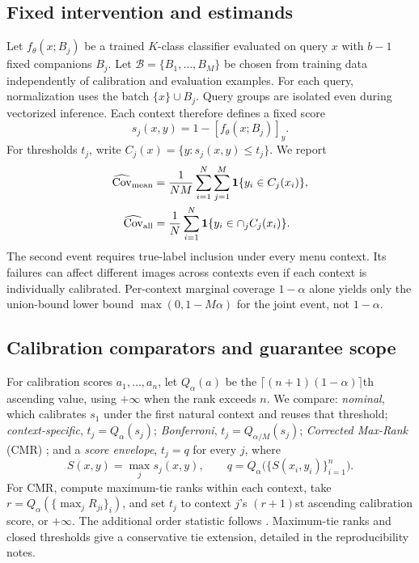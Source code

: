 \documentclass{article}
\begin{document}
\subsection{Fixed intervention and estimands}
Let $f_\theta(x;B_j)$ be a trained $K$-class classifier evaluated on query $x$ with $b-1$ fixed companions $B_j$. Let $\mathcal B=\{B_1,\ldots,B_M\}$ be chosen from training data independently of calibration and evaluation examples. For each query, normalization uses the batch $\{x\}\cup B_j$. Query groups are isolated even during vectorized inference. Each context therefore defines a fixed score
\begin{equation}
 s_j(x,y)=1-[f_\theta(x;B_j)]_y.
\end{equation}
For thresholds $t_j$, write $C_j(x)=\{y:s_j(x,y)\le t_j\}$. We report
\begin{align}
 \widehat{\mathrm{Cov}}_{\rm mean}&=\frac1{NM}\sum_{i=1}^{N}\sum_{j=1}^{M}\mathbf1\{y_i\in C_j(x_i)\},\\
 \widehat{\mathrm{Cov}}_{\rm all}&=\frac1N\sum_{i=1}^{N}\mathbf1\{y_i\in\cap_j C_j(x_i)\}.
\end{align}
The second event requires true-label inclusion under every menu context. Its failures can affect different images across contexts even if each context is individually calibrated. Per-context marginal coverage $1-\alpha$ alone yields only the union-bound lower bound $\max(0,1-M\alpha)$ for the joint event, not $1-\alpha$.

\subsection{Calibration comparators and guarantee scope}
For calibration scores $a_1,\ldots,a_n$, let $Q_\alpha(a)$ be the $\lceil(n+1)(1-\alpha)\rceil$th ascending value, using $+\infty$ when the rank exceeds $n$. We compare: \emph{nominal}, which calibrates $s_1$ under the first natural context and reuses that threshold; \emph{context-specific}, $t_j=Q_\alpha(s_j)$; \emph{Bonferroni}, $t_j=Q_{\alpha/M}(s_j)$; \emph{Corrected Max-Rank} (CMR) \cite{corrected}; and a \emph{score envelope}, $t_j=q$ for every $j$, where
\begin{equation}\label{eq:envelope}
 S(x,y)=\max_j s_j(x,y),\qquad q=Q_\alpha\big(\{S(x_i,y_i)\}_{i=1}^n\big).
\end{equation}
For CMR, compute maximum-tie ranks within each context, take $r=Q_\alpha(\{\max_j R_{ji}\}_i)$, and set $t_j$ to context $j$'s $(r+1)$st ascending calibration score, or $+\infty$. The additional order statistic follows \cite{corrected}. Maximum-tie ranks and closed thresholds give a conservative tie extension, detailed in the reproducibility notes.
\end{document}
